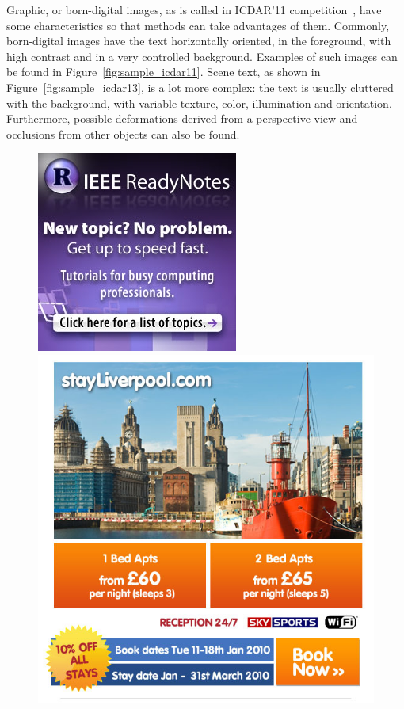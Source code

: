     Graphic, or born-digital images, as is called in ICDAR'11 competition~\cite{Karatzas2011ICDAR}, have some characteristics so that methods can take advantages of them. Commonly, born-digital images have the text horizontally oriented, in the foreground, with high contrast and in a very controlled background. Examples of such images can be found in Figure~\ref{fig:sample_icdar11}. Scene text, as shown in Figure~\ref{fig:sample_icdar13}, is a lot more complex: the text is usually cluttered with the background, with variable texture, color, illumination and orientation. Furthermore, possible deformations derived from a perspective view and occlusions from other objects can also be found.
    \begin{figure}[h!]
    \centering
	\includegraphics[height=0.19\textheight]{dataset_samples/icdar11/img_40.jpg}
	\includegraphics[height=0.19\textheight]{related_work/figs/icdar11_img_33.png}

\end{figure}
